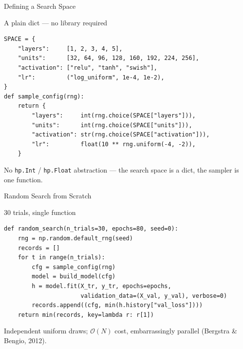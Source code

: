 \documentclass[aspectratio=169,11pt]{beamer}
\begin{document}
\begin{frame}[fragile]{Defining a Search Space}
\begin{block}{A plain dict --- no library required}
{\scriptsize
\begin{verbatim}
SPACE = {
    "layers":     [1, 2, 3, 4, 5],
    "units":      [32, 64, 96, 128, 160, 192, 224, 256],
    "activation": ["relu", "tanh", "swish"],
    "lr":         ("log_uniform", 1e-4, 1e-2),
}
def sample_config(rng):
    return {
        "layers":     int(rng.choice(SPACE["layers"])),
        "units":      int(rng.choice(SPACE["units"])),
        "activation": str(rng.choice(SPACE["activation"])),
        "lr":         float(10 ** rng.uniform(-4, -2)),
    }
\end{verbatim}
}
\end{block}
{\scriptsize No \texttt{hp.Int} / \texttt{hp.Float} abstraction --- the search space is a dict, the sampler is one function.}
\end{frame}

\begin{frame}[fragile]{Random Search from Scratch}
\begin{block}{30 trials, single function}
{\scriptsize
\begin{verbatim}
def random_search(n_trials=30, epochs=80, seed=0):
    rng = np.random.default_rng(seed)
    records = []
    for t in range(n_trials):
        cfg = sample_config(rng)
        model = build_model(cfg)
        h = model.fit(X_tr, y_tr, epochs=epochs,
                      validation_data=(X_val, y_val), verbose=0)
        records.append((cfg, min(h.history["val_loss"])))
    return min(records, key=lambda r: r[1])
\end{verbatim}
}
\end{block}
{\scriptsize Independent uniform draws; $\mathcal{O}(N)$ cost, embarrassingly parallel (Bergstra \& Bengio, 2012).}
\end{frame}
\end{document}
